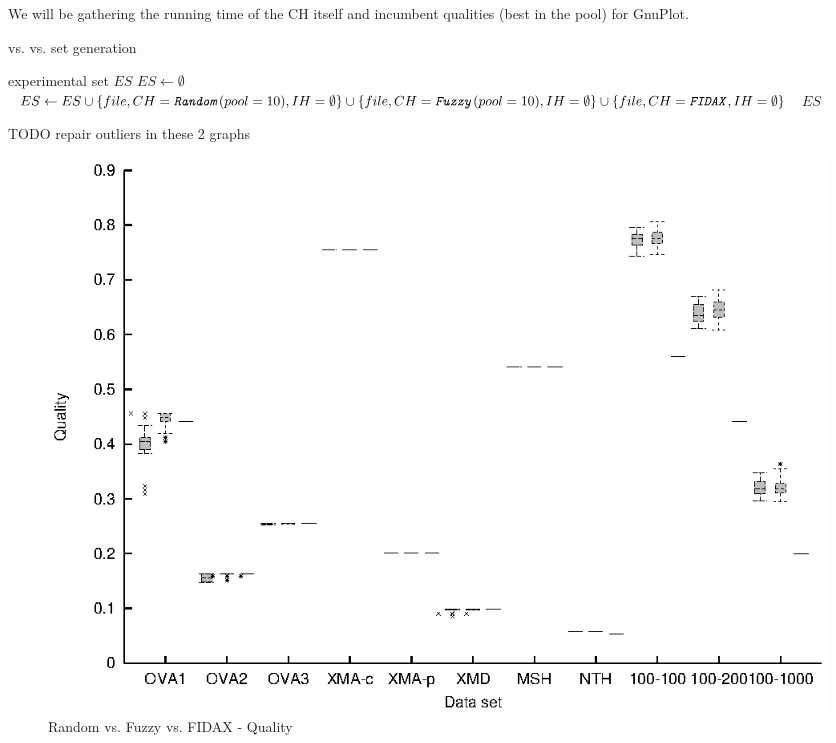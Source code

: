 We will be gathering the running time of the CH itself and incumbent qualities (best in the pool) for GnuPlot.

\begin{algorithm}
\caption{ vs.  vs.  set generation}
\label{listing-experiment-random-fuzzy-fidax}
\begin{algorithmic}
\ENSURE experimental set $ES$
\STATE $ES \gets \emptyset$
    \STATE $ES \gets ES \cup \{file, CH = \texttt{\textit{Random}}(pool = 10), IH = \emptyset\} \cup \{file, CH = \texttt{\textit{Fuzzy}}(pool = 10), IH = \emptyset\} \cup \{file, CH = \texttt{\textit{FIDAX}}, IH = \emptyset\}$
  \ENDFOR
\ENDFOR
\RETURN $ES$
\end{algorithmic}
\end{algorithm}

TODO repair outliers in these 2 graphs

\begin{figure}
  \caption{Random vs. Fuzzy vs. FIDAX - Quality}
  \label{image-experiment-random-fuzzy-fidax-quality}
  \centering
    \includegraphics[width=\textwidth]{images/experiments/random-fuzzy-fidax-quality}
\end{figure}

